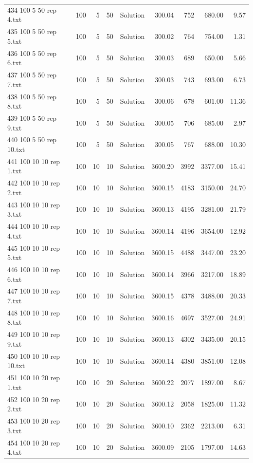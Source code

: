 \begin{longtable}{lrrllrrrr}
434 100 5 50 rep 4.txt & 100 & 5 & 50 & Solution & 300.04 & 752 & 680.00 &  9.57\\
435 100 5 50 rep 5.txt & 100 & 5 & 50 & Solution & 300.02 & 764 & 754.00 &  1.31\\
436 100 5 50 rep 6.txt & 100 & 5 & 50 & Solution & 300.03 & 689 & 650.00 &  5.66\\
437 100 5 50 rep 7.txt & 100 & 5 & 50 & Solution & 300.03 & 743 & 693.00 &  6.73\\
438 100 5 50 rep 8.txt & 100 & 5 & 50 & Solution & 300.06 & 678 & 601.00 & 11.36\\
439 100 5 50 rep 9.txt & 100 & 5 & 50 & Solution & 300.05 & 706 & 685.00 &  2.97\\
440 100 5 50 rep 10.txt & 100 & 5 & 50 & Solution & 300.05 & 767 & 688.00 & 10.30\\
441 100 10 10 rep 1.txt & 100 & 10 & 10 & Solution & 3600.20 & 3992 & 3377.00 & 15.41\\
442 100 10 10 rep 2.txt & 100 & 10 & 10 & Solution & 3600.15 & 4183 & 3150.00 & 24.70\\
443 100 10 10 rep 3.txt & 100 & 10 & 10 & Solution & 3600.13 & 4195 & 3281.00 & 21.79\\
444 100 10 10 rep 4.txt & 100 & 10 & 10 & Solution & 3600.14 & 4196 & 3654.00 & 12.92\\
445 100 10 10 rep 5.txt & 100 & 10 & 10 & Solution & 3600.15 & 4488 & 3447.00 & 23.20\\
446 100 10 10 rep 6.txt & 100 & 10 & 10 & Solution & 3600.14 & 3966 & 3217.00 & 18.89\\
447 100 10 10 rep 7.txt & 100 & 10 & 10 & Solution & 3600.15 & 4378 & 3488.00 & 20.33\\
448 100 10 10 rep 8.txt & 100 & 10 & 10 & Solution & 3600.16 & 4697 & 3527.00 & 24.91\\
449 100 10 10 rep 9.txt & 100 & 10 & 10 & Solution & 3600.13 & 4302 & 3435.00 & 20.15\\
450 100 10 10 rep 10.txt & 100 & 10 & 10 & Solution & 3600.14 & 4380 & 3851.00 & 12.08\\
451 100 10 20 rep 1.txt & 100 & 10 & 20 & Solution & 3600.22 & 2077 & 1897.00 &  8.67\\
452 100 10 20 rep 2.txt & 100 & 10 & 20 & Solution & 3600.12 & 2058 & 1825.00 & 11.32\\
453 100 10 20 rep 3.txt & 100 & 10 & 20 & Solution & 3600.10 & 2362 & 2213.00 &  6.31\\
454 100 10 20 rep 4.txt & 100 & 10 & 20 & Solution & 3600.09 & 2105 & 1797.00 & 14.63\\

\end{longtable}
